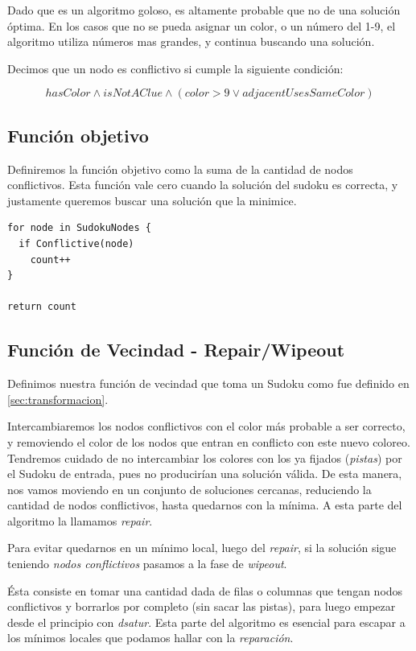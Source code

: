\documentclass[a4paper,spanish]{article}
\begin{document}
Dado que es un algoritmo goloso, es altamente probable que no de una solución óptima.
En los casos que no se pueda asignar un color, o un número del 1-9, el algoritmo
utiliza números mas grandes, y continua buscando una solución.

Decimos que un nodo es conflictivo si cumple la siguiente condición:

\begin{equation}
    hasColor \wedge isNotAClue \wedge ( color > 9 \vee adjacentUsesSameColor)
\end{equation}

\subsection{Función objetivo}

Definiremos la función objetivo como la suma de la cantidad de nodos conflictivos. 
Esta función vale cero cuando la solución del sudoku es correcta, y justamente queremos
buscar una solución que la minimice.

\begin{Verbatim}[samepage=true]
for node in SudokuNodes {
  if Conflictive(node)
    count++
}

return count
\end{Verbatim}


\subsection{Función de Vecindad - Repair/Wipeout}

Definimos nuestra función de vecindad que toma un Sudoku como fue
definido en \ref{sec:transformacion}.

Intercambiaremos los nodos conflictivos con el color más probable a ser correcto,
y removiendo el color de los nodos que entran en conflicto con este nuevo coloreo.
Tendremos cuidado de no intercambiar los colores con los ya fijados (\emph{pistas})
por el Sudoku de entrada, pues no producirían una solución válida.
De esta manera, nos vamos moviendo en un conjunto de soluciones cercanas, reduciendo
la cantidad de nodos conflictivos, hasta quedarnos con la mínima.
A esta parte del algoritmo la llamamos \emph{repair}.

Para evitar quedarnos en un mínimo local, luego del \emph{repair}, si la solución
sigue teniendo \textit{nodos conflictivos} pasamos a la fase de \emph{wipeout}.

Ésta consiste en tomar una cantidad dada de filas o columnas que tengan nodos
conflictivos y borrarlos por completo (sin sacar las pistas), para luego empezar
desde el principio con \emph{dsatur}. Esta parte del algoritmo es esencial para escapar
a los mínimos locales que podamos hallar con la \textit{reparación}.
\end{document}
